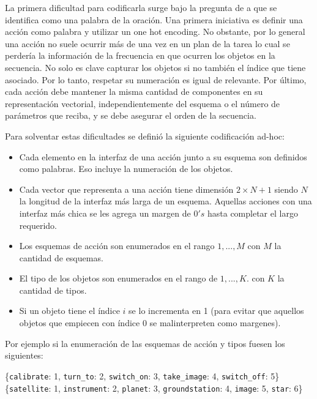 La primera dificultad para codificarla surge bajo la pregunta de a que se
identifica como una palabra de la oración. Una primera iniciativa es definir una
acción como palabra y utilizar un one hot encoding. No obstante, por lo general
una acción no suele ocurrir más de una vez en un plan de la tarea lo cual se
perdería la información de la frecuencia en que ocurren los objetos en la
secuencia. No solo es clave capturar los objetos si no también el índice que
tiene asociado. Por lo tanto, respetar su numeración es igual de relevante. Por
último, cada acción debe mantener la misma cantidad de componentes en su
representación vectorial, independientemente del esquema o el número de
parámetros que reciba, y se debe asegurar el orden de la secuencia.

Para solventar estas dificultades se definió la siguiente codificación ad-hoc:

\begin{itemize}
    \item Cada elemento en la interfaz de una acción junto a su esquema son
    definidos como palabras. Eso incluye la numeración de los objetos.
    \item Cada vector que representa a una acción tiene dimensión $2 \times N +
    1$ siendo $N$ la longitud de la interfaz más larga de un esquema. Aquellas
    acciones con una interfaz más chica se les agrega un margen de $0's$ hasta
    completar el largo requerido.
    \item Los esquemas de acción son enumerados en el rango $1, ..., M$ con $M$
    la cantidad de esquemas.
    \item El tipo de los objetos son enumerados en el rango de $1, ..., K$. con
    $K$ la cantidad de tipos.
    \item Si un objeto tiene el índice $i$ se lo incrementa en 1 (para evitar
    que aquellos objetos que empiecen con índice 0 se malinterpreten como
    margenes).
\end{itemize}

Por ejemplo si la enumeración de las esquemas de acción y tipos fuesen los
siguientes:

\begin{center}
    \{\verb|calibrate|: 1, \verb|turn_to|: 2, \verb|switch_on|: 3,
    \verb|take_image|: 4, \verb|switch_off|: 5\} \\
    \{\verb|satellite|: 1, \verb|instrument|: 2, \verb|planet|: 3,
    \verb|groundstation|: 4, \verb|image|: 5, \verb|star|: 6\}
\end{center}


